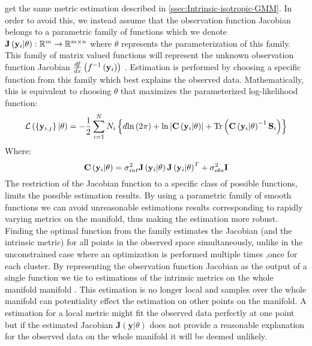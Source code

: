 	get the same metric estimation described in \cref{ssec:Intrinsic-isotropic-GMM}.
	In order to avoid this, we instead assume that the observation function
	Jacobian belongs to a parametric family of functions which we denote
	$\mathbf{J}\left({\bf y}_{i}|\theta\right):\mathbb{R}^{m}\to\mathbb{R}^{m\times n}$
	where $\theta$ represents the parameterization of this family. This
	family of matrix valued functions will represent the unknown observation
	function Jacobian $\frac{df}{dx}\left(f^{-1}\left({\bf y}_{i}\right)\right)$
	. Estimation is performed by choosing a specific function from this
	family which best explains the observed data. Mathematically, this
	is equivalent to choosing $\theta$ that maximizes the parameterized
	log-likelihood function:
	\begin{equation}
	\mathcal{L}\left(\left\{ {\bf y}_{i.j}\right\} |\theta\right)=-\frac{1}{2}\sum_{i=1}^{N}N_{i}\left\{ d\text{ln}\left(2\pi\right)+\text{ln}\left|{\bf C}\left({\bf y}_{i}|\theta\right)\right|+\text{Tr}\left(\mathbf{\mathbf{C}}\left({\bf y}_{i}|\theta\right)^{-1}\mathbf{S}_{i}\right)\right\} \label{eq:Ann-cost}
	\end{equation}
	Where:
	\[
	\mathbf{C}\left({\bf y}_{i}|\theta\right)=\sigma_{int}^{2}\mathbf{J}\left({\bf y}_{i}|\theta\right)\mathbf{J}\left({\bf y}_{i}|\theta\right)^{T}+\sigma_{obs}^{2}\mathbf{I}
	\]
	The restriction of the Jacobian function to a specific class of possible
	functions, limits the possible estimation results. By using a parametric
	family of smooth functions we can avoid unreasonable estimations results
	corresponding to rapidly varying metrics on the manifold, thus making
	the estimation more robust. Finding the optimal function from the
	family estimates the Jacobian (and the intrinsic metric) for all points
	in the observed space simultaneously, unlike in the unconstrained
	case where an optimization is performed multiple times ,once for each
	cluster. By representing the observation function Jacobian as the
	output of a single function we tie to estimations of the intrinsic
	metrics on the whole manifold manifold . This estimation is no longer
	local and samples over the whole manifold can potentiality effect
	the estimation on other points on the manifold. A estimation for a
	local metric might fit the observed data perfectly at one point but
	if the estimated Jacobian $\mathbf{J}\left(\mathbf{y}|\theta\right)$
	does not provide a reasonable explanation for the observed data on
	the whole manifold it will be deemed unlikely.

